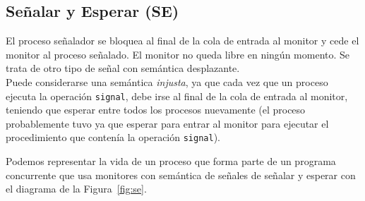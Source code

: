 \subsection{Señalar y Esperar (SE)}
El proceso señalador se bloquea al final de la cola de entrada al monitor y cede el monitor al proceso señalado. El monitor no queda libre en ningún momento. Se trata de otro tipo de señal con semántica desplazante.\\

Puede considerarse una semántica \textit{injusta}, ya que cada vez que un proceso ejecuta la operación \verb|signal|, debe irse al final de la cola de entrada al monitor, teniendo que esperar entre todos los procesos nuevamente (el proceso probablemente tuvo ya que esperar para entrar al monitor para ejecutar el procedimiento que contenía la operación \verb|signal|).

Podemos representar la vida de un proceso que forma parte de un programa concurrente que usa monitores con semántica de señales de señalar y esperar con el diagrama de la Figura~\ref{fig:se}.

